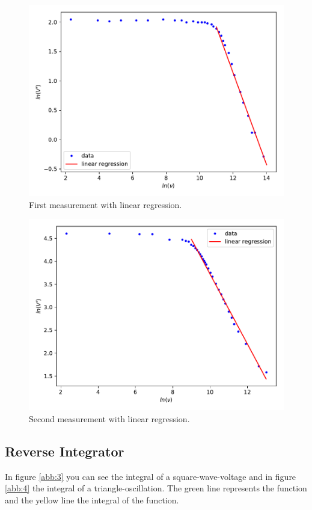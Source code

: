 \begin{figure}
  \centering
  \includegraphics[scale=0.7]{A1.pdf}
  \caption{First measurement with linear regression.}
  \label{abb:1}
\end{figure}
\begin{figure}
  \centering
  \includegraphics[scale=0.7]{A2.pdf}
  \caption{Second measurement with linear regression.}
  \label{abb:2}
\end{figure}

\subsection{Reverse Integrator}
In figure \ref{abb:3} you can see the integral of a square-wave-voltage and in
figure \ref{abb:4} the integral of a triangle-oscillation.
The green line represents the function and the yellow line the integral of
the function.

